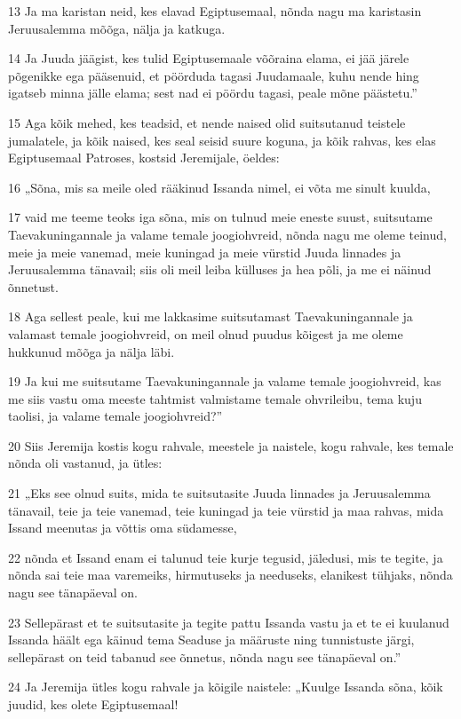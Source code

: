 \par 13 Ja ma karistan neid, kes elavad Egiptusemaal, nõnda nagu ma karistasin Jeruusalemma mõõga, nälja ja katkuga.
\par 14 Ja Juuda jäägist, kes tulid Egiptusemaale võõraina elama, ei jää järele põgenikke ega pääsenuid, et pöörduda tagasi Juudamaale, kuhu nende hing igatseb minna jälle elama; sest nad ei pöördu tagasi, peale mõne päästetu.”
\par 15 Aga kõik mehed, kes teadsid, et nende naised olid suitsutanud teistele jumalatele, ja kõik naised, kes seal seisid suure koguna, ja kõik rahvas, kes elas Egiptusemaal Patroses, kostsid Jeremijale, öeldes:
\par 16 „Sõna, mis sa meile oled rääkinud Issanda nimel, ei võta me sinult kuulda,
\par 17 vaid me teeme teoks iga sõna, mis on tulnud meie eneste suust, suitsutame Taevakuningannale ja valame temale joogiohvreid, nõnda nagu me oleme teinud, meie ja meie vanemad, meie kuningad ja meie vürstid Juuda linnades ja Jeruusalemma tänavail; siis oli meil leiba külluses ja hea põli, ja me ei näinud õnnetust.
\par 18 Aga sellest peale, kui me lakkasime suitsutamast Taevakuningannale ja valamast temale joogiohvreid, on meil olnud puudus kõigest ja me oleme hukkunud mõõga ja nälja läbi.
\par 19 Ja kui me suitsutame Taevakuningannale ja valame temale joogiohvreid, kas me siis vastu oma meeste tahtmist valmistame temale ohvrileibu, tema kuju taolisi, ja valame temale joogiohvreid?”
\par 20 Siis Jeremija kostis kogu rahvale, meestele ja naistele, kogu rahvale, kes temale nõnda oli vastanud, ja ütles:
\par 21 „Eks see olnud suits, mida te suitsutasite Juuda linnades ja Jeruusalemma tänavail, teie ja teie vanemad, teie kuningad ja teie vürstid ja maa rahvas, mida Issand meenutas ja võttis oma südamesse,
\par 22 nõnda et Issand enam ei talunud teie kurje tegusid, jäledusi, mis te tegite, ja nõnda sai teie maa varemeiks, hirmutuseks ja needuseks, elanikest tühjaks, nõnda nagu see tänapäeval on.
\par 23 Sellepärast et te suitsutasite ja tegite pattu Issanda vastu ja et te ei kuulanud Issanda häält ega käinud tema Seaduse ja määruste ning tunnistuste järgi, sellepärast on teid tabanud see õnnetus, nõnda nagu see tänapäeval on.”
\par 24 Ja Jeremija ütles kogu rahvale ja kõigile naistele: „Kuulge Issanda sõna, kõik juudid, kes olete Egiptusemaal!
